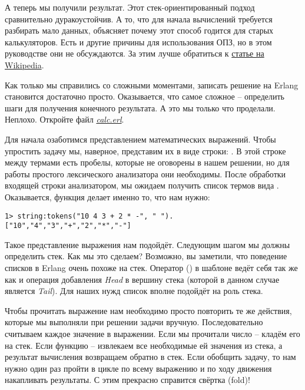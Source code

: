 А теперь мы получили результат.
Этот стек\--ориентированный подход сравнительно дуракоустойчив.
А то, что для начала вычислений требуется разбирать мало данных, объясняет почему этот способ годится для старых калькуляторов.
Есть и другие причины для использования ОПЗ, но в этом руководстве они не обсуждаются.
За этим лучше обратиться к \href{http://en.wikipedia.org/wiki/Reverse_Polish_notation}{статье на Wikipedia}.

Как только мы справились со сложными моментами, записать решение на Erlang становится достаточно просто.
Оказывается, что самое сложное \--- определить шаги для получения конечного результата.
А это мы только что проделали.
Неплохо.
Откройте файл \emph{\href{http://learnyousomeerlang.com/static/erlang/calc.erl}{calc.erl}}.

Для начала озаботимся представлением математических выражений.
Чтобы упростить задачу мы, наверное, представим их в виде строки: .
В этой строке между термами есть пробелы, которые не оговорены в нашем решении, но для работы простого лексического анализатора они необходимы.
После обработки входящей строки анализатором, мы ожидаем получить список термов вида \ops{[''10'',''4'',''3'',''+'',''2'',''*'',''-'']}.
Оказывается, функция  делает именно то, что нам нужно:
\begin{lstlisting}[style=erlang]
1> string:tokens("10 4 3 + 2 * -", " ").
["10","4","3","+","2","*","-"]
\end{lstlisting}

Такое представление выражения нам подойдёт.
Следующим шагом мы должны определить стек.
Как мы это сделаем?
Возможно, вы заметили, что поведение списков в Erlang очень похоже на стек.
Оператор (\ops{|}) в шаблоне  ведёт себя так же как и операция добавления \emph{Head} в вершину стека (которой в данном случае является \emph{Tail}).
Для наших нужд список вполне подойдёт на роль стека.

Чтобы прочитать выражение нам необходимо просто повторить те же действия, которые мы выполняли при решении задачи вручную.
Последовательно считываем каждое значение в выражении.
Если мы прочитали число \--- кладём его на стек.
Если функцию \--- извлекаем все необходимые ей значения из стека, а результат вычисления возвращаем обратно в стек.
Если обобщить задачу, то нам нужно один раз пройти в цикле по всему выражению и по ходу движения накапливать результаты.
С этим прекрасно справится свёртка (fold)!

